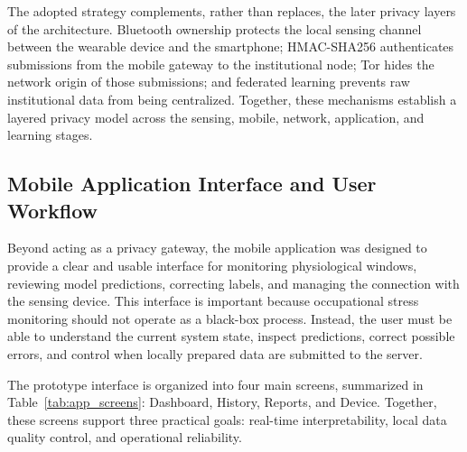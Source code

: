 \documentclass[12pt]{article}
\begin{document}
The adopted strategy complements, rather than replaces, the later privacy layers of the architecture. Bluetooth ownership protects the local sensing channel between the wearable device and the smartphone; HMAC-SHA256 authenticates submissions from the mobile gateway to the institutional node; Tor hides the network origin of those submissions; and federated learning prevents raw institutional data from being centralized. Together, these mechanisms establish a layered privacy model across the sensing, mobile, network, application, and learning stages.

\FloatBarrier

\subsection{Mobile Application Interface and User Workflow}

Beyond acting as a privacy gateway, the mobile application was designed to provide a clear and usable interface for monitoring physiological windows, reviewing model predictions, correcting labels, and managing the connection with the sensing device. This interface is important because occupational stress monitoring should not operate as a black-box process. Instead, the user must be able to understand the current system state, inspect predictions, correct possible errors, and control when locally prepared data are submitted to the server.

The prototype interface is organized into four main screens, summarized in Table~\ref{tab:app_screens}: Dashboard, History, Reports, and Device. Together, these screens support three practical goals: real-time interpretability, local data quality control, and operational reliability.

\begin{table}[htbp]
\centering
\caption{Main screens and user-facing functions of the mobile prototype.}
\label{tab:app_screens}
\end{table}
\end{document}
